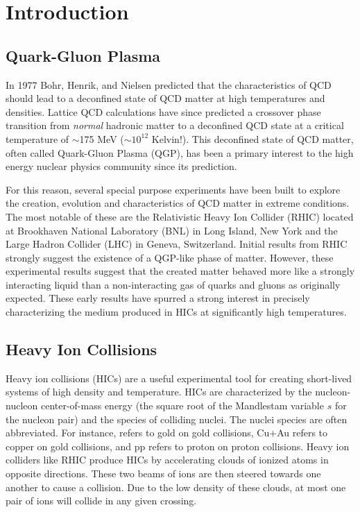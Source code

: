 \section{Introduction}

	\subsection{Quark-Gluon Plasma}
	\label{sec:qgp}
	In 1977 Bohr, Henrik, and Nielsen predicted that the characteristics of QCD should lead to a deconfined state of QCD matter at high temperatures and densities\cite{bohr_hadron_1977}.  Lattice QCD calculations have since predicted a crossover phase transition from \textit{normal} hadronic matter to a deconfined QCD state at a critical temperature of $\sim$175 MeV ($\sim10^{12}$ Kelvin!)\cite{karsch_phase_1995}. This deconfined state of QCD matter, often called Quark-Gluon Plasma (QGP), has been a primary interest to the high energy nuclear physics community since its prediction. 

	For this reason, several special purpose experiments have been built to explore the creation, evolution and characteristics of QCD matter in extreme conditions. The most notable of these are the Relativistic Heavy Ion Collider (RHIC) located at Brookhaven National Laboratory (BNL) in Long Island, New York and the Large Hadron Collider (LHC) in Geneva, Switzerland. Initial results from RHIC strongly suggest the existence of a QGP-like phase of matter. However, these experimental results suggest that the created matter behaved more like a strongly interacting liquid than a non-interacting gas of quarks and gluons as originally expected\cite{bohr_hadron_1977}. These early results have spurred a strong interest in precisely characterizing the medium produced in HICs at significantly high temperatures. 

	\subsection{Heavy Ion Collisions}
	\label{sec:hic}
	Heavy ion collisions (HICs) are a useful experimental tool for creating short-lived systems of high density and temperature. HICs are characterized by the nucleon-nucleon center-of-mass energy \snn (the square root of the Mandlestam variable $s$ for the nucleon pair) and the species of colliding nuclei. The nuclei species are often abbreviated. For instance, \auau refers to gold on gold collisions, Cu$+$Au refers to copper on gold collisions, and pp refers to proton on proton collisions. Heavy ion colliders like RHIC produce HICs by accelerating clouds of ionized atoms in opposite directions. These two beams of ions are then steered towards one another to cause a collision. Due to the low density of these clouds, at most one pair of ions will collide in any given crossing. 

